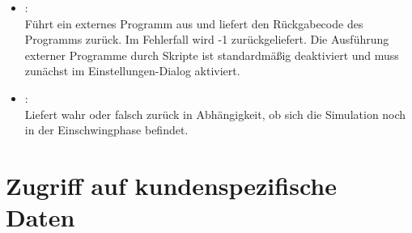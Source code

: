 \begin{itemize}
\item
{}:\\
Führt ein externes Programm aus und liefert den Rückgabecode des Programms zurück.
Im Fehlerfall wird -1 zurückgeliefert.
Die Ausführung externer Programme durch Skripte ist standardmäßig deaktiviert
und muss zunächst im Einstellungen-Dialog aktiviert.

\item
{}:\\
Liefert wahr oder falsch zurück in Abhängigkeit, ob sich die Simulation noch in der Einschwingphase befindet.

\end{itemize}

\section{Zugriff auf kundenspezifische Daten}

